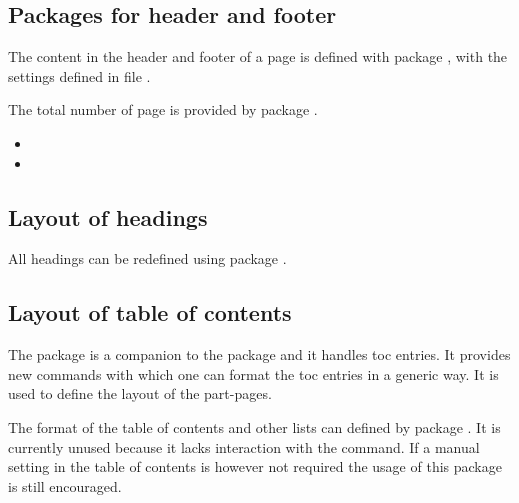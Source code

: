 
\subsection{Packages for header and footer}
\label{sec:packages:headfoot}

The content in the header and footer of a page is defined with package 
, with the settings defined in file 
.

The total number of page is provided by package .

\begin{itemize}[noitemsep]
\item {}
\item {}
\end{itemize}


\subsection{Layout of headings}
\label{sec:packages:headings}

All headings can be redefined using package .


\subsection{Layout of table of contents}
\label{sec:packages:TOC}

The  package is a companion to the  package and it handles toc entries. It provides new commands with which one
can format the toc entries in a generic way. It is used to define the layout of the part-pages.

The format of the table of contents and other lists can defined by package . It is currently unused because it lacks interaction with the  command. If a manual setting in the table of contents is however not required the usage of this package is still encouraged.


